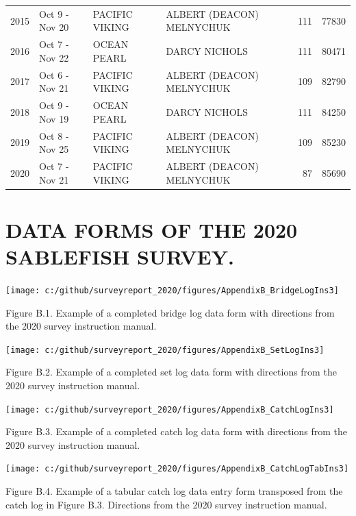 \documentclass[12pt]{article}\usepackage[]{graphicx}\usepackage[]{color}
\begin{document}
\begin{appendices}
\begin{longtable}{rlllrr}
2015 & Oct  9  - Nov 20 & PACIFIC VIKING & ALBERT (DEACON) MELNYCHUK & 111 & 77830\\
2016 & Oct  7  - Nov 22 & OCEAN PEARL & DARCY NICHOLS & 111 & 80471\\
2017 & Oct  6  - Nov 21 & PACIFIC VIKING & ALBERT (DEACON) MELNYCHUK & 109 & 82790\\
2018 & Oct  9  - Nov 19 & OCEAN PEARL & DARCY NICHOLS & 111 & 84250\\
2019 & Oct  8  - Nov 25 & PACIFIC VIKING & ALBERT (DEACON) MELNYCHUK & 109 & 85230\\
2020 & Oct  7  - Nov 21 & PACIFIC VIKING & ALBERT (DEACON) MELNYCHUK & 87 & 85690\\
\bottomrule
\end{longtable}
\endgroup{}

\clearpage

\section{DATA FORMS OF THE 2020 SABLEFISH SURVEY.}
\label{app:second-appendix}
\begin{flushleft}\texttt{[image: c:/github/surveyreport\_2020/figures/AppendixB\_BridgeLogIns3]} \end{flushleft}

Figure B.1. Example of a completed bridge log data form with directions from the 2020 survey instruction manual.

\clearpage
\begin{flushleft}\texttt{[image: c:/github/surveyreport\_2020/figures/AppendixB\_SetLogIns3]} \end{flushleft}

Figure B.2. Example of a completed set log data form with directions from the 2020 survey instruction manual.

\clearpage
\begin{flushleft}\texttt{[image: c:/github/surveyreport\_2020/figures/AppendixB\_CatchLogIns3]} \end{flushleft}

Figure B.3. Example of a completed catch log data form with directions from the 2020 survey instruction manual. \clearpage
\begin{flushleft}\texttt{[image: c:/github/surveyreport\_2020/figures/AppendixB\_CatchLogTabIns3]} \end{flushleft}

Figure B.4. Example of a tabular catch log data entry form transposed from the catch log in Figure B.3. Directions from the 2020 survey instruction manual.


\end{appendices}
\end{document}
